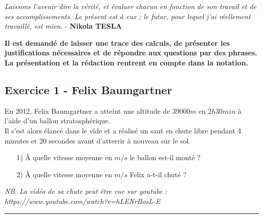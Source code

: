 \documentclass[12pt]{article}
\newcommand{\horrule}[1]{\rule{\linewidth}{#1}} %
\begin{document}

\begin{center}
  \textit{Laissons l’avenir dire la vérité, et évaluer chacun en fonction de son travail et de ses accomplissements. Le présent est à eux ; le futur, pour lequel j’ai réellement travaillé, est mien.} - \textbf{Nikola TESLA}
\end{center}

\textbf{Il est demandé de laisser une trace des calculs, de présenter les justifications nécessaires et de répondre aux questions par des phrases. La présentation et la rédaction rentrent en compte dans la notation.}

\subsection*{Exercice 1 - Felix Baumgartner}

En 2012, Felix Baumgartner a atteint une altitude de $39000m$ en $2h30min$ à l'aide d'un ballon stratosphérique. \\
Il s'est alors élancé dans le vide et a réalisé un saut en chute libre pendant $4$ minutes et $20$ secondes avant d'atterrir à nouveau sur le sol.\\

\begin{enumerate}
\item[1)] À quelle vitesse moyenne en $m/s$ le ballon est-il monté ? 
\item[2)] À quelle vitesse moyenne en $m/s$ Felix a-t-il chuté ? \\
\end{enumerate}

\textit{NB. La vidéo de sa chute peut être vue sur youtube : https://www.youtube.com/watch?v=hLENrBosL-E}

\horrule{1px}
\end{document}
